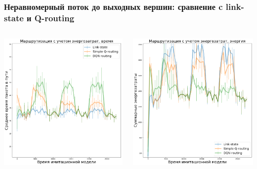 \documentclass{beamer}
\begin{document}

\begin{frame}
  \frametitle{Неравномерный поток до выходных вершин: сравнение c link-state и Q-routing}
  \begin{columns}
    \begin{column}{0.5\textwidth}
      \includegraphics[width=\textwidth]{experiment-conveyors-en1-time-tall}
    \end{column}
    \begin{column}{0.5\textwidth}
      \includegraphics[width=\textwidth]{experiment-conveyors-en1-energy-tall}

\end{column}
\end{columns}
\end{frame}
\end{document}

